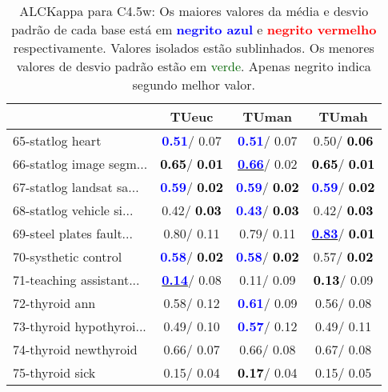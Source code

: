 \begin{table}[h]
\caption{ALCKappa para C4.5w: Os maiores valores da média e desvio padrão de cada base está em \textcolor{blue}{\textbf{negrito azul}} e \textcolor{red}{\textbf{negrito vermelho}} respectivamente. Valores isolados estão sublinhados. Os menores valores de desvio padrão estão em \textcolor{darkgreen}{verde}. Apenas negrito indica segundo melhor valor.}
\begin{center}\begin{tabular}{lc|c|c}
 & TUeuc & TUman & TUmah\\ \hline 65-statlog heart & \textcolor{blue}{\textbf{  0.51}}/  0.07 & \textcolor{blue}{\textbf{  0.51}}/  0.07 &   0.50/\textcolor{black}{\textbf{  0.06}} \\
66-statlog image segm... & \textcolor{black}{\textbf{  0.65}}/\textcolor{black}{\textbf{  0.01}} & \underline{\textcolor{blue}{\textbf{  0.66}}}/  0.02 & \textcolor{black}{\textbf{  0.65}}/\textcolor{black}{\textbf{  0.01}} \\
67-statlog landsat sa... & \textcolor{blue}{\textbf{  0.59}}/\textcolor{black}{\textbf{  0.02}} & \textcolor{blue}{\textbf{  0.59}}/\textcolor{black}{\textbf{  0.02}} & \textcolor{blue}{\textbf{  0.59}}/\textcolor{black}{\textbf{  0.02}} \\
68-statlog vehicle si... &   0.42/\textcolor{black}{\textbf{  0.03}} & \textcolor{blue}{\textbf{  0.43}}/\textcolor{black}{\textbf{  0.03}} &   0.42/\textcolor{black}{\textbf{  0.03}} \\
69-steel plates fault... &   0.80/  0.11 &   0.79/  0.11 & \underline{\textcolor{blue}{\textbf{  0.83}}}/\textcolor{black}{\textbf{  0.01}} \\
70-systhetic control & \textcolor{blue}{\textbf{  0.58}}/\textcolor{black}{\textbf{  0.02}} & \textcolor{blue}{\textbf{  0.58}}/\textcolor{black}{\textbf{  0.02}} &   0.57/\textcolor{black}{\textbf{  0.02}} \\
71-teaching assistant... & \underline{\textcolor{blue}{\textbf{  0.14}}}/  0.08 &   0.11/  0.09 & \textcolor{black}{\textbf{  0.13}}/  0.09 \\ \hline
72-thyroid ann &   0.58/  0.12 & \textcolor{blue}{\textbf{  0.61}}/  0.09 &   0.56/  0.08 \\
73-thyroid hypothyroi... &   0.49/  0.10 & \textcolor{blue}{\textbf{  0.57}}/  0.12 &   0.49/  0.11 \\
74-thyroid newthyroid &   0.66/  0.07 &   0.66/  0.08 &   0.67/  0.08 \\
75-thyroid sick &   0.15/  0.04 & \textcolor{black}{\textbf{  0.17}}/  0.04 &   0.15/  0.05 \\

\end{tabular}
\end{center}
\end{table}
